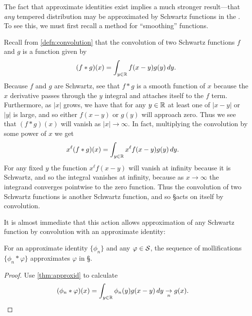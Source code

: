     The fact that approximate identities exist implies a much stronger result---that \emph{any} tempered distribution may be approximated by Schwartz functions in the \ws.
    To see this, we must first recall a method for ``smoothing'' functions.

    Recall from \cref{defn:convolution} that the convolution of two Schwartz functions $f$ and $g$ is a function given by
    \begin{align*}
      (f*g)(x) = \int_{y\in\R} f(x-y)g(y)\,dy \text{.}
    \end{align*}
    Because $f$ and $g$ are Schwartz, see that $f*g$ is a smooth function of $x$ because the $x$ derivative passes through the $y$ integral and attaches itself to the $f$ term.
    Furthermore, as $|x|$ grows, we have that for any $y\in\R$ at least one of $|x-y|$ or $|y|$ is large, and so either $f(x-y)$ or $g(y)$ will approach zero.
    Thus we see that $(f*g)(x)$ will vanish as $|x|\rightarrow\infty$.
    In fact, multiplying the convolution by some power of $x$ we get
    \begin{align*}
      x^\ell(f*g)(x)
      &= \int_{y\in\R} x^\ell f(x-y)g(y)\,dy \text{.}
    \end{align*}
    For any fixed $y$ the function $x^\ell f(x-y)$ will vanish at infinity because it is Schwartz, and so the integral vanishes at infinity, because as $x\rightarrow\infty$ the integrand converges pointwise to the zero function.
    Thus the convolution of two Schwartz functions is another Schwartz function, and so \S acts on itself by convolution.

    It is almost immediate that this action allows approximation of any Schwartz function by convolution with an approximate identity:
    \begin{lemma}
      \label{lemma:approxbyconv}
      For an approximate identity $\{\phi_n\}$ and any $\varphi\in\S$, the sequence of mollifications $\{\phi_n*\varphi\}$ approximates $\varphi$ in \S.
    \end{lemma}
    \begin{proof}
      Use \cref{thm:approxid} to calculate
      \begin{align*}
        (\phi_n*\varphi)(x)
        &= \int_{y\in\R} \phi_n(y)g(x-y)\,dy
        \underset{n}{\rightarrow} g(x) \text{.}
      \end{align*}
    \end{proof}

